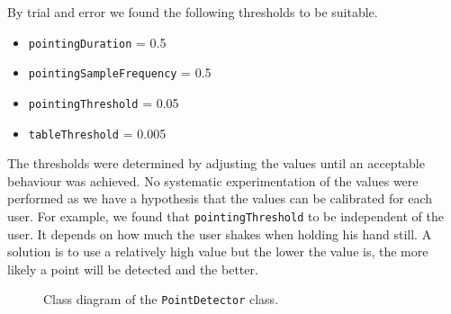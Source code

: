 By trial and error we found the following thresholds to be suitable.

\begin{itemize}
\item \texttt{pointingDuration} = 0.5
\item \texttt{pointingSampleFrequency} = 0.5
\item \texttt{pointingThreshold} = 0.05
\item \texttt{tableThreshold} = 0.005
\end{itemize}

The thresholds were determined by adjusting the values until an acceptable behaviour was achieved. No systematic experimentation of the values were performed as we have a hypothesis that the values can be calibrated for each user. For example, we found that \texttt{pointingThreshold} to be independent of the user. It depends on how much the user shakes when holding his hand still. A solution is to use a relatively high value but the lower the value is, the more likely a point will be detected and the better.

\begin{figure}
  \centering
  \caption{Class diagram of the \texttt{PointDetector} class.}
  \label{fig:gesture-recognition:pointdetector-uml}
\end{figure}

